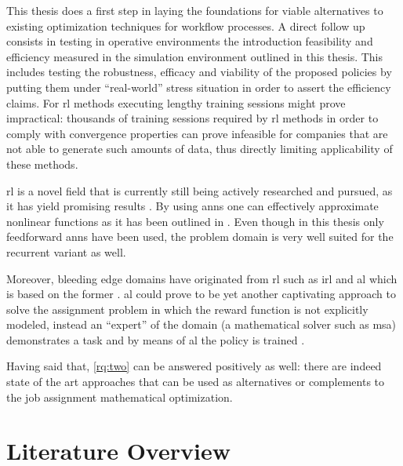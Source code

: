 \documentclass[draft=false]{seal_thesis}
\begin{document}
This thesis does a first step in laying the foundations for viable alternatives to existing optimization techniques for workflow processes. A direct follow up consists in testing in operative environments the introduction feasibility and efficiency measured in the simulation environment outlined in this thesis. This includes testing the robustness, efficacy and viability of the proposed policies by putting them under ``real-world'' stress situation in order to assert the efficiency claims. For \gls{rl} methods executing lengthy training sessions might prove impractical: thousands of training sessions required by \gls{rl} methods in order to comply with convergence properties can prove infeasible for companies that are not able to generate such amounts of data, thus directly limiting applicability of these methods.

\gls{rl} is a novel field that is currently still being actively researched and pursued, as it has yield promising results \citep{Mnih2015,Silver2016}. By using \glspl{ann} one can effectively approximate nonlinear functions as it has been outlined in . Even though in this thesis only feedforward \glspl{ann} have been used, the problem domain is very well suited for the recurrent variant as well.

Moreover, bleeding edge domains have originated from \gls{rl} such as \gls{irl} \citep{Ng2000} and \gls{al} which is based on the former \citep{Abbeel2004}. \gls{al} could prove to be yet another captivating approach to solve the assignment problem in which the reward function is not explicitly modeled, instead an ``expert'' of the domain (\ie a mathematical solver such as \gls{msa}) demonstrates a task and by means of \gls{al} the policy is trained \citep{Abbeel2004}.

Having said that, \ref{rq:two} can be answered positively as well: there are indeed state of the art approaches that can be used as alternatives or complements to the job assignment mathematical optimization. 

\appendix

\glsresetall

\chapter{Literature Overview}


\clearpage
\end{document}
